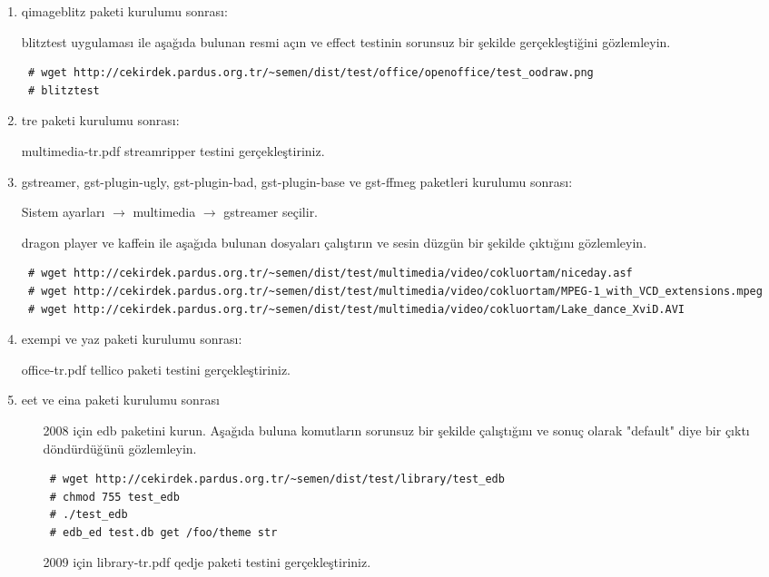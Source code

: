 \documentclass[a4paper,10pt]{article}
\begin{document}
\begin{enumerate}
\item qimageblitz paketi kurulumu sonrası:

blitztest uygulaması ile aşağıda bulunan resmi açın ve effect testinin sorunsuz bir şekilde gerçekleştiğini gözlemleyin.
\begin{verbatim}
 # wget http://cekirdek.pardus.org.tr/~semen/dist/test/office/openoffice/test_oodraw.png
 # blitztest
\end{verbatim}


\item tre paketi kurulumu sonrası:

multimedia-tr.pdf streamripper testini gerçekleştiriniz.

\item gstreamer, gst-plugin-ugly, gst-plugin-bad, gst-plugin-base ve gst-ffmeg paketleri kurulumu sonrası:

Sistem ayarları $\rightarrow$ multimedia $\rightarrow$ gstreamer seçilir. 

dragon player ve kaffein ile aşağıda bulunan dosyaları çalıştırın ve sesin düzgün bir şekilde çıktığını gözlemleyin.
\begin{verbatim}
 # wget http://cekirdek.pardus.org.tr/~semen/dist/test/multimedia/video/cokluortam/niceday.asf
 # wget http://cekirdek.pardus.org.tr/~semen/dist/test/multimedia/video/cokluortam/MPEG-1_with_VCD_extensions.mpeg
 # wget http://cekirdek.pardus.org.tr/~semen/dist/test/multimedia/video/cokluortam/Lake_dance_XviD.AVI
\end{verbatim}

\item exempi ve yaz paketi kurulumu sonrası:

office-tr.pdf tellico paketi testini gerçekleştiriniz.

\item eet ve eina paketi kurulumu sonrası
\begin{itemize}
 \item [2008 için] edb paketini kurun. Aşağıda buluna komutların sorunsuz bir şekilde çalıştığını ve sonuç olarak "default" diye bir çıktı döndürdüğünü gözlemleyin.
\begin{verbatim}
 # wget http://cekirdek.pardus.org.tr/~semen/dist/test/library/test_edb
 # chmod 755 test_edb
 # ./test_edb
 # edb_ed test.db get /foo/theme str
\end{verbatim}
\item [2009 için] library-tr.pdf qedje paketi testini gerçekleştiriniz.
\end{itemize}


\end{enumerate}
\end{document}
